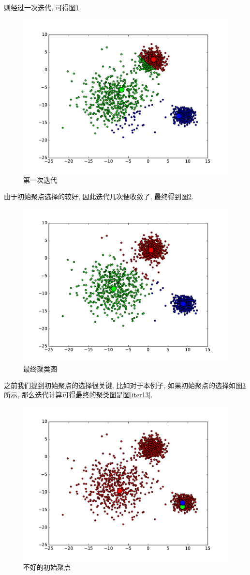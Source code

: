 \documentclass[a4paper,UTF8]{ctexart}
\theoremstyle{plain} \newtheorem{theorem}{定理}[section]
\theoremstyle{plain} \newtheorem{definition}{定义}[section]
\theoremstyle{plain} \newtheorem{lemma}{引理}[section]
\theoremstyle{plain} \newtheorem{proposition}{命题}[section]
\theoremstyle{plain} \newtheorem{example}{例}[section]
\theoremstyle{plain} \newtheorem{remark}{注}[section]
\theoremstyle{plain} \newtheorem{corollary}{推论}[section]
\begin{document}
则经过一次迭代, 可得图\ref{iter01}.
\begin{figure}[!htb]
	\centering
	\includegraphics[width = 0.75 \textwidth]{iter_01.pdf}
	\caption{第一次迭代}
	\label{iter01}
\end{figure}

由于初始聚点选择的较好, 因此迭代几次便收敛了, 最终得到图\ref{iter04}.
\begin{figure}[!htb]
	\centering
	\includegraphics[width = 0.75 \textwidth]{iter_04.pdf}
	\caption{最终聚类图}
	\label{iter04}
\end{figure}

之前我们提到初始聚点的选择很关键, 比如对于本例子, 如果初始聚点的选择如图\ref{iter10}所示, 那么迭代计算可得最终的聚类图是图\ref{iter13}.
\begin{figure}[!htb]
	\centering
	\includegraphics[width = 0.75 \textwidth]{iter_10.pdf}
	\caption{不好的初始聚点}
	\label{iter10}
\end{figure}
\end{document}
